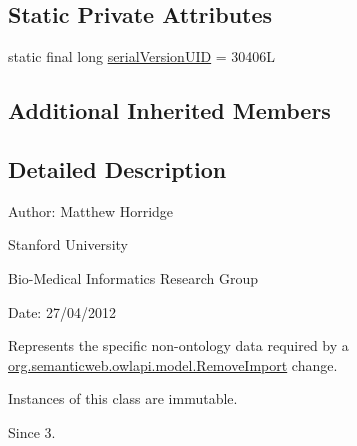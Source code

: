 \subsection*{Static Private Attributes}
\begin{DoxyCompactItemize}
\item 
static final long \hyperlink{classorg_1_1semanticweb_1_1owlapi_1_1change_1_1_remove_import_data_a26826e85be0fd5fe47b544794e874448}{serial\-Version\-U\-I\-D} = 30406\-L
\end{DoxyCompactItemize}
\subsection*{Additional Inherited Members}


\subsection{Detailed Description}
Author\-: Matthew Horridge\par
 Stanford University\par
 Bio-\/\-Medical Informatics Research Group\par
 Date\-: 27/04/2012 

Represents the specific non-\/ontology data required by a \hyperlink{classorg_1_1semanticweb_1_1owlapi_1_1model_1_1_remove_import}{org.\-semanticweb.\-owlapi.\-model.\-Remove\-Import} change. 

Instances of this class are immutable. 

\begin{DoxySince}{Since}
3. 
\end{DoxySince}


